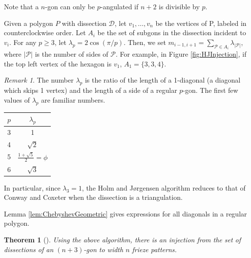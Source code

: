 \documentclass[12pt]{article}
\newtheorem{theorem}{Theorem}
\theoremstyle{remark}
\newtheorem{remark}{Remark}
\begin{document}
Note that a $n$-gon can only be $p$-angulated if $n+2$ is divisible by $p$. 


Given a polygon $P$ with dissection $\mathcal{D}$, let $v_1,\ldots,v_n$ be the vertices of P, labeled in counterclockwise order. Let $A_i$ be the set of subgons in the dissection incident to $v_i$. For any $p \geq 3$, let $\lambda_p = 2\cos(\pi/p)$. Then, we set $m_{i-1,i+1} = \sum_{\mathcal{P} \in A_i} \lambda_{\vert \mathcal{P} \vert}$, where $\vert \mathcal{P} \vert$ is the number of sides of $\mathcal{P}$. For example, in Figure \ref{fig:HJInjection}, if the top left vertex of the hexagon is $v_1$, $A_1 = \{3,3,4\}$. 

\begin{remark}
The number $\lambda_p$ is the ratio of the length of a 1-diagonal (a diagonal which skips 1 vertex) and the length of a side of a regular $p$-gon. The first few values of $\lambda_p$ are familiar numbers.
\begin{center}
    \begin{tabular}{|c|c|}\hline
        $p$ & $\lambda_p$  \\\hline
        3 & 1 \\
        4 & $\sqrt{2}$ \\
        5 & $\frac{1 + \sqrt{5}}{2} = \phi$ \\
        6 & $\sqrt{3}$\\\hline
    \end{tabular}
\end{center}
In particular, since $\lambda_3 = 1$, the Holm and J{\o}rgensen algorithm reduces to that of Conway and Coxeter when the dissection is a triangulation. 

Lemma \ref{lem:ChebyshevGeometric} gives expressions for all diagonals in a regular polygon. 
\end{remark}

\begin{theorem}[\cite{14}]
 Using the above algorithm, there is an injection from the set of dissections of an $(n+3)$-gon to width $n$ frieze patterns. 
\end{theorem}
\end{document}
